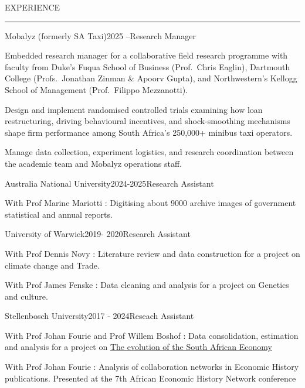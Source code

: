 \documentclass{resume} %
\renewenvironment{rSection}[1]{
\sectionskip
\textcolor{RoyalPurple}{\MakeUppercase{#1}}
\sectionlineskip
\hrule
\begin{list}{}{
\setlength{\leftmargin}{1.5em}
}
\item[]
}{
\end{list}
}
\begin{document}

\begin{rSection}{Experience}

\begin{rSubsection}{Mobalyz (formerly SA Taxi)}{2025 --}{Research Manager}{}
\item Embedded research manager for a collaborative field research programme with faculty from Duke's Fuqua School of Business (Prof.\ Chris Eaglin), Dartmouth College (Profs.\ Jonathan Zinman \& Apoorv Gupta), and Northwestern's Kellogg School of Management (Prof.\ Filippo Mezzanotti).
\item Design and implement randomised controlled trials examining how loan restructuring, driving behavioural incentives, and shock-smoothing mechanisms shape firm performance among South Africa's 250,000+ minibus taxi operators.
\item Manage data collection, experiment logistics, and research coordination between the academic team and Mobalyz operations staff.
\end{rSubsection}


\begin{rSubsection}{Australia National University}{2024-2025}{Research Assistant}{}
\item {With Prof Marine Mariotti} : Digitising about 9000 archive images of government statistical and annual reports.

\end{rSubsection}



\begin{rSubsection}{University of Warwick}{2019- 2020}{Research Assistant}{}
\item {With Prof Dennis Novy} :  Literature review and data construction for a project on climate change and Trade.

\item {With Prof James Fenske} : Data cleaning and analysis for a project on Genetics and culture.
\end{rSubsection}


\begin{rSubsection}{Stellenbosch University}{2017 - 2024}{Reseach Assistant }{}
\item {With Prof Johan Fourie and Prof Willem Boshof} : Data consolidation, estimation and analysis for a project on \href{https://link.springer.com/chapter/10.1007/978-3-030-35754-2_3 }{The evolution of the South African Economy}
\item {With Prof Johan Fourie} : Analysis of collaboration networks in Economic History publications. Presented at the 7th African Economic History Network conference
\end{rSubsection}
\vspace{-1em}


\end{rSection}
\end{document}

